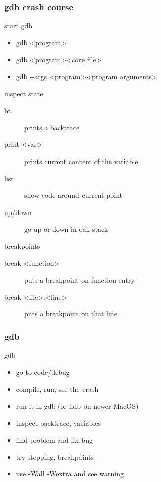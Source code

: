 \begin{frame}[fragile]
  \frametitle{gdb crash course}
  \begin{block}{start gdb}
    \begin{itemize}
    \item gdb \textless{}program\textgreater
    \item gdb \textless{}program\textgreater \textless{}core file\textgreater
    \item gdb -{}-args \textless{}program\textgreater \textless{}program arguments\textgreater
    \end{itemize}
  \end{block}
  \begin{block}{inspect state}
    \begin{description}
    \item[bt] prints a backtrace
    \item[print \textless{}var\textgreater] prints current content of the variable
    \item[list] show code around current point
    \item[up/down] go up or down in call stack
    \end{description}
  \end{block}
  \begin{block}{breakpoints}
    \begin{description}
    \item[break \textless{}function\textgreater] puts a breakpoint on function entry
    \item[break \textless{}file\textgreater:\textless{}line\textgreater] puts a breakpoint on that line
    \end{description}
  \end{block}
\end{frame}

\begin{frame}[fragile]
  \frametitle{gdb}
  \begin{exercise}{gdb}
    \begin{itemize}
    \item go to code/debug
    \item compile, run, see the crash
    \item run it in gdb (or lldb on newer MacOS)
    \item inspect backtrace, variables
    \item find problem and fix bug
    \item try stepping, breakpoints
    \item use -Wall -Wextra and see warning
    \end{itemize}
  \end{exercise}
\end{frame}

